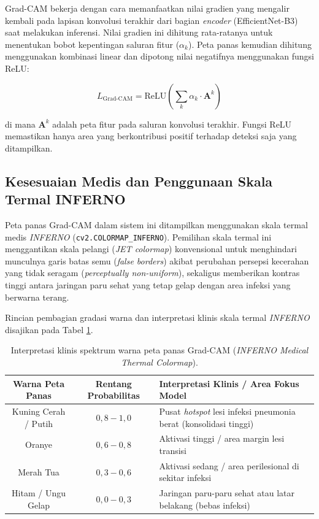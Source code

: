 \documentclass[12pt,a4paper,oneside]{book}
\begin{document}
Grad-CAM bekerja dengan cara memanfaatkan nilai gradien yang mengalir kembali pada lapisan konvolusi terakhir dari bagian \textit{encoder} (EfficientNet-B3) saat melakukan inferensi. Nilai gradien ini dihitung rata-ratanya untuk menentukan bobot kepentingan saluran fitur ($\alpha_k$). Peta panas kemudian dihitung menggunakan kombinasi linear dan dipotong nilai negatifnya menggunakan fungsi ReLU:

\begin{equation}
  L_{\text{Grad-CAM}} = \text{ReLU}\!\left( \sum_k \alpha_k \cdot \mathbf{A}^k \right)
\end{equation}

di mana $\mathbf{A}^k$ adalah peta fitur pada saluran konvolusi terakhir. Fungsi ReLU memastikan hanya area yang berkontribusi positif terhadap deteksi saja yang ditampilkan.

\subsection{Kesesuaian Medis dan Penggunaan Skala Termal INFERNO}

Peta panas Grad-CAM dalam sistem ini ditampilkan menggunakan skala termal medis \textit{INFERNO} (\texttt{cv2.COLORMAP\_INFERNO}). Pemilihan skala termal ini menggantikan skala pelangi (\textit{JET colormap}) konvensional untuk menghindari munculnya garis batas semu (\textit{false borders}) akibat perubahan persepsi kecerahan yang tidak seragam (\textit{perceptually non-uniform}), sekaligus memberikan kontras tinggi antara jaringan paru sehat yang tetap gelap dengan area infeksi yang berwarna terang.

Rincian pembagian gradasi warna dan interpretasi klinis skala termal \textit{INFERNO} disajikan pada Tabel \ref{tab:inferno_spectrum}.

\begin{table}[htbp]
  \centering
  \caption{Interpretasi klinis spektrum warna peta panas Grad-CAM (\textit{INFERNO Medical Thermal Colormap}).}
  \label{tab:inferno_spectrum}
  \begin{tabularx}{\textwidth}{ccX}
    \toprule
    \textbf{Warna Peta Panas} & \textbf{Rentang Probabilitas} & \textbf{Interpretasi Klinis / Area Fokus Model} \\
    \midrule
    Kuning Cerah / Putih & $0,8 - 1,0$ & Pusat \textit{hotspot} lesi infeksi pneumonia berat (konsolidasi tinggi) \\
    Oranye               & $0,6 - 0,8$ & Aktivasi tinggi / area margin lesi transisi \\
    Merah Tua            & $0,3 - 0,6$ & Aktivasi sedang / area perilesional di sekitar infeksi \\
    Hitam / Ungu Gelap   & $0,0 - 0,3$ & Jaringan paru-paru sehat atau latar belakang (bebas infeksi) \\
    \bottomrule
  \end{tabularx}
\end{table}
\end{document}

